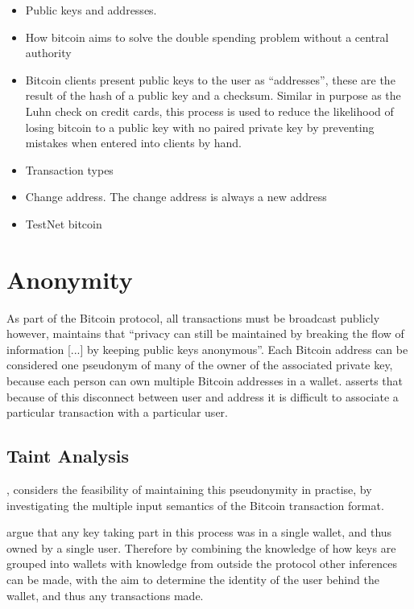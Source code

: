 \begin{itemize} \item Public keys and addresses.  \item How bitcoin aims to
        solve the double spending problem without a central authority \item
            Bitcoin clients present public keys to the user as ``addresses'',
            these are the result of the hash of a public key and a checksum.
            Similar in purpose as the Luhn check on credit cards, this process
        is used to reduce the likelihood of losing bitcoin to a public key with
    no paired private key by preventing mistakes when entered into clients by
hand.  \item Transaction types \item Change address.  The change address is
always a new address \item TestNet bitcoin \end{itemize}

\section{Anonymity} As part of the Bitcoin protocol, all transactions must be
broadcast publicly however, \textcite{satoshi} maintains that ``privacy can still be
maintained by breaking the flow of information [...] by keeping public keys
anonymous''.  Each Bitcoin address can be considered one pseudonym of many of
the owner of the associated private key, because each person can own multiple
Bitcoin addresses in a wallet. \textcite{satoshi} asserts that because of this disconnect
between user and address it is difficult to associate a particular transaction
with a particular user.

\subsection{Taint Analysis} \textcite{reid-anon}, considers the feasibility of
maintaining this pseudonymity in practise, by investigating the multiple input
semantics of the Bitcoin transaction format. 

\textcite{reid-anon} argue that any key taking part in this process was in a single
wallet, and thus owned by a single user. Therefore by combining the knowledge of
how keys are grouped into wallets with knowledge from outside the protocol other
inferences can be made, with the aim to determine the identity of the user
behind the wallet, and thus any transactions made.

